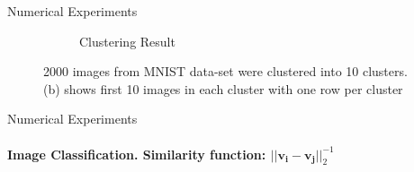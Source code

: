 \documentclass[10pt,a4paper, nocenter]{beamer}
\begin{document}
\begin{frame}{Numerical Experiments}
\begin{figure}[h]
\begin{center}
\begin{subfigure}[b]{0.45\textwidth}
					\caption{Clustering Result}
					\label{fig:clustering_10_0norm}
				\end{subfigure}           
			\end{center}
			\caption{2000 images from MNIST data-set were clustered into 10 clusters. (b) shows first 10 images in each cluster with one row per cluster}
			\label{fig:mnist10ClusterImages_1}
		\end{figure}
		
	\end{frame}
	
	
	\begin{frame}{Numerical Experiments}
		\framesubtitle{Image Classification. Similarity function: $\lvert \lvert \mathbf{v_i} - \mathbf{v_j} \rvert \rvert_2^{-1}$}
		\begin{figure}[h]
			\begin{center}


\end{center}
\end{figure}
\end{frame}
\end{document}
